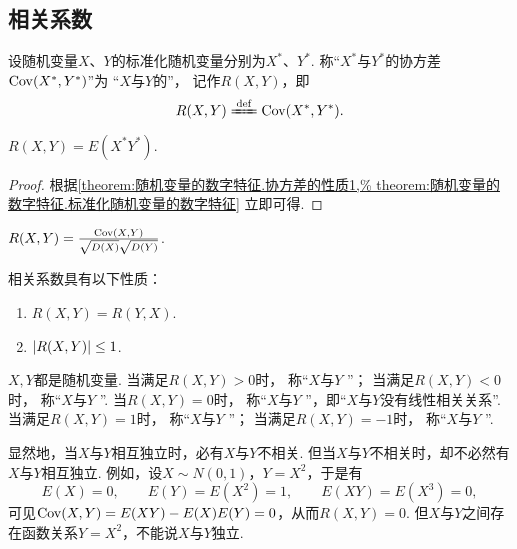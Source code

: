 \subsection{相关系数}
\begin{definition}\label{definition:随机变量的数字特征.相关系数}
设随机变量\(X\)、\(Y\)的标准化随机变量分别为\(X^*\)、\(Y^*\).
称“\(X^*\)与\(Y^*\)的协方差\(\operatorname{Cov}(X^*,Y^*)\)”为%
“\(X\)与\(Y\)的”，
记作\(R(X,Y)\)，即\[
    R(X,Y) \defeq \Cov(X^*,Y^*).
\]
\end{definition}

\begin{theorem}\label{theorem:随机变量的数字特征.相关系数的性质1}
\(R(X,Y) = E(X^* Y^*)\).
\begin{proof}
根据\cref{theorem:随机变量的数字特征.协方差的性质1,%
theorem:随机变量的数字特征.标准化随机变量的数字特征} 立即可得.
\end{proof}
\end{theorem}

\begin{theorem}\label{theorem:随机变量的数字特征.相关系数的性质2}
\(R(X,Y) = \frac{\operatorname{Cov}(X,Y)}{\sqrt{D(X)} \sqrt{D(Y)}}\).
\end{theorem}

\begin{property}
相关系数具有以下性质：
\begin{enumerate}
    \item \(R(X,Y)=R(Y,X)\).
    \item \(\abs{R(X,Y)} \leq 1\).
\end{enumerate}
\end{property}

\(X,Y\)都是随机变量.
当满足\(R(X,Y) > 0\)时，
称“\(X\)与\(Y\) ”；
当满足\(R(X,Y) < 0\)时，
称“\(X\)与\(Y\) ”.
当\(R(X,Y) = 0\)时，
称“\(X\)与\(Y\) ”，即“\(X\)与\(Y\)没有线性相关关系”.
当满足\(R(X,Y) = 1\)时，
称“\(X\)与\(Y\) ”；
当满足\(R(X,Y) = -1\)时，
称“\(X\)与\(Y\) ”.

显然地，当\(X\)与\(Y\)相互独立时，必有\(X\)与\(Y\)不相关.
但当\(X\)与\(Y\)不相关时，却不必然有\(X\)与\(Y\)相互独立.
例如，设\(X \sim N(0,1)\)，\(Y=X^2\)，于是有\[
    E(X) = 0,
    \qquad
    E(Y) = E(X^2) = 1,
    \qquad
    E(XY) = E(X^3) = 0,
\]
可见\(\operatorname{Cov}(X,Y) = E(XY) - E(X) E(Y) = 0\)，从而\(R(X,Y) = 0\).
但\(X\)与\(Y\)之间存在函数关系\(Y=X^2\)，不能说\(X\)与\(Y\)独立.
